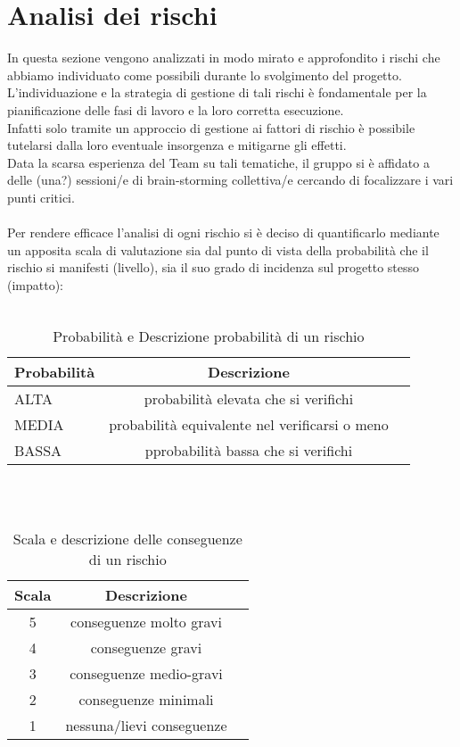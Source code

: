 \section{Analisi dei rischi}
In questa sezione vengono analizzati in modo mirato e approfondito i rischi che abbiamo individuato come possibili durante lo svolgimento del progetto. L'individuazione e la strategia di gestione di tali rischi è fondamentale per la pianificazione delle fasi di lavoro e la loro corretta esecuzione.\\
Infatti solo tramite un approccio di gestione ai fattori di rischio è possibile tutelarsi dalla loro eventuale insorgenza e mitigarne gli effetti.\\
Data la scarsa esperienza del Team su tali tematiche, il gruppo si è affidato a delle (una?) sessioni/e di brain-storming collettiva/e cercando di focalizzare i vari punti critici. \\\\
Per rendere efficace l'analisi di ogni rischio si è deciso di quantificarlo mediante un apposita scala di valutazione sia dal punto di vista della probabilità che il rischio si manifesti (livello), sia il suo grado di incidenza sul progetto stesso (impatto):\\\\
\begin{table}[h]
\centering
\begin{tabular}{|l|cl|}
\hline
Probabilità& Descrizione&  \\
\hline
ALTA & probabilità elevata che si verifichi&\\
MEDIA & probabilità equivalente nel verificarsi o meno&\\
BASSA & pprobabilità bassa che si verifichi&\\
\hline
\end{tabular}
\caption{Probabilità e Descrizione probabilità di un rischio}
\end{table}
\\\\
\begin{table}[h]
\centering
\begin{tabular}{|c|cl|}
\hline
Scala& Descrizione&  \\
\hline
5 & conseguenze molto gravi&\\
4 & conseguenze gravi&\\
3 & conseguenze medio-gravi&\\
2 & conseguenze minimali&\\
1 & nessuna/lievi conseguenze&\\
\hline
\end{tabular}
\caption{Scala e descrizione delle conseguenze di un rischio}
\end{table}

